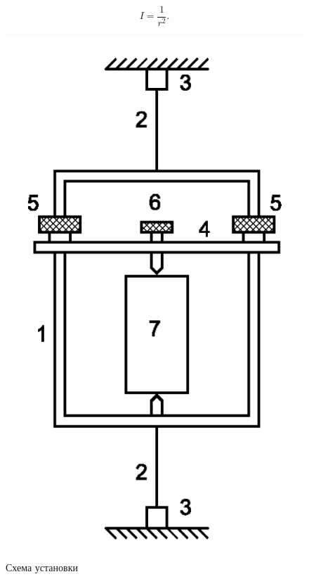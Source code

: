 \documentclass[a4paper,12pt]{article} %
\begin{document}
\begin{equation} I = \frac{1}{r^2}. \label{eq:2} \end{equation}

\begin{figure} [H] \center 
	\includegraphics[scale = 0.3]{data/рис. 2.png}
	\label{pic:2} \caption[Рис. 2]{Схема установки}

\end{figure}
\end{document}
